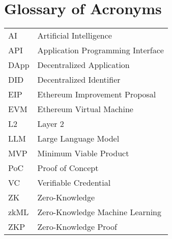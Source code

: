 ﻿\chapter*{Glossary of Acronyms}
\begin{longtable}{ll}
AI & Artificial Intelligence \\
API & Application Programming Interface \\
DApp & Decentralized Application \\
DID & Decentralized Identifier \\
EIP & Ethereum Improvement Proposal \\
EVM & Ethereum Virtual Machine \\
L2 & Layer 2 \\
LLM & Large Language Model \\
MVP & Minimum Viable Product \\
PoC & Proof of Concept \\
VC & Verifiable Credential \\
ZK & Zero-Knowledge \\
zkML & Zero-Knowledge Machine Learning \\
ZKP & Zero-Knowledge Proof \\
\end{longtable}
